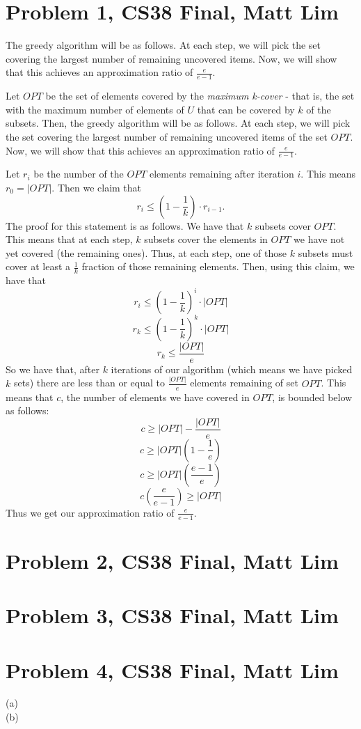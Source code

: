 \documentclass{article}
\begin{document}
\section*{Problem 1, CS38 Final, Matt Lim}
The greedy algorithm will be as follows. At each step, we will pick the set
covering the largest number of remaining uncovered items. Now, we will show that
this achieves an approximation ratio of $\frac{e}{e-1}$.

Let $OPT$ be the set of elements covered by the \textit{maximum k-cover} - that is, the set
with the maximum number of elements of $U$ that can be covered by $k$ of the
subsets. Then, the greedy algorithm will be as follows. At each step, we will pick the set
covering the largest number of remaining uncovered items of the set $OPT$. Now, we will show that
this achieves an approximation ratio of $\frac{e}{e-1}$.


Let $r_i$ be the number of the $OPT$ elements remaining after
iteration $i$. This means $r_0 = |OPT|$. Then we claim that
\[ r_i \leq (1 - \frac{1}{k}) \cdot r_{i-1}. \]
The proof for this statement is as follows. We have
that $k$ subsets cover $OPT$. This means that at each step, $k$ subsets
cover the elements in $OPT$ we have not yet covered (the remaining ones).
Thus, at each step, one of those $k$ subsets must cover at least a $\frac{1}{k}$
fraction of those remaining elements. Then, using this claim, we have that
\[ r_i \leq (1 - \frac{1}{k})^i \cdot |OPT| \]
\[ r_k \leq (1 - \frac{1}{k})^k \cdot |OPT| \]
\[ r_k \leq \frac{|OPT|}{e} \]
So we have that, after $k$ iterations of our algorithm (which means we have
picked $k$ sets) there are less than or equal to $\frac{|OPT|}{e}$ elements
remaining of set $OPT$. This means that $c$, the number of elements we have
covered in $OPT$, is bounded below as follows:
\[ c \geq |OPT| - \frac{|OPT|}{e} \]
\[ c \geq |OPT|(1 - \frac{1}{e}) \]
\[ c \geq |OPT|(\frac{e-1}{e}) \]
\[ c(\frac{e}{e-1}) \geq |OPT| \]
Thus we get our approximation ratio of $\frac{e}{e-1}$.
\newpage

\section*{Problem 2, CS38 Final, Matt Lim}
\newpage

\section*{Problem 3, CS38 Final, Matt Lim}
\newpage

\section*{Problem 4, CS38 Final, Matt Lim}
\begin{description}
    \item[(a)]
    \item[(b)]
\end{description}
\newpage

\end{document}
